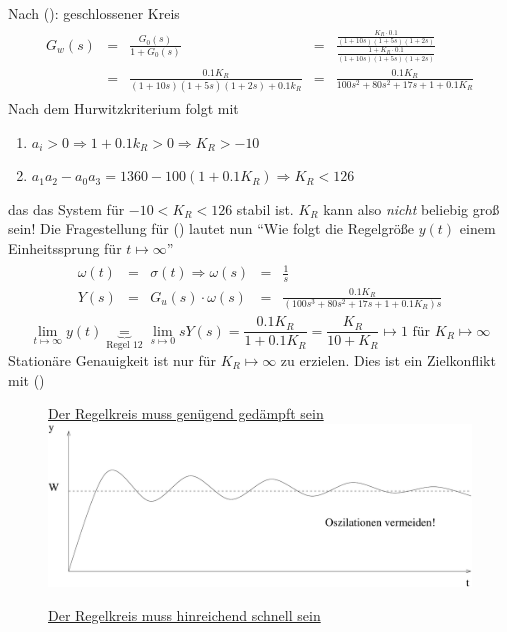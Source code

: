 \message{ !name(Mitschrieb_SysRegel.tex)}\documentclass[12pt,a4paper,ngerman]{scrartcl}
\newcommand{\RM}[1]{\MakeUppercase{\romannumeral #1{.}}}
\begin{document}
\begin{itemize}
Nach (\RM{1}): geschlossener Kreis
\begin{align*}
  \begin{array}{llllll}
    G_w(s)&=&\frac{G_0(s)}{1+G_0(s)}&=&\frac{\frac{K_R\cdot 0.1}{(1+10s)(1+5s)(1+2s)}}{\frac{1+K_R\cdot 0.1}{(1+10s)(1+5s)(1+2s)}}\\
    &=&\frac{0.1K_R}{(1+10s)(1+5s)(1+2s)+0.1k_R}&=&\frac{0.1K_R}{100s^2+80s^2+17s+1+0.1K_R}
  \end{array}
\end{align*}
Nach dem Hurwitzkriterium folgt mit
\begin{enumerate}
\item $a_i>0 \Rightarrow 1+0.1k_R>0\Rightarrow K_R> -10$
\item $a_1a_2-a_0a_3=1360-100(1+0.1K_R)\Rightarrow K_R<126$
\end{enumerate}
das das System für $-10<K_R<126$ stabil ist. $K_R$ kann also \emph{nicht} beliebig groß sein! Die Fragestellung für (\RM{2}) lautet nun ``Wie folgt die Regelgröße $y(t)$ einem Einheitssprung für $t\mapsto \infty$''
\begin{align*}
  \begin{array}{lllll}
    \omega (t)&=&\sigma(t)\Rightarrow \omega (s)&=&\frac{1}{s}\\
    Y(s)&=&G_u(s)\cdot\omega (s)&=&\frac{0.1K_R}{(100s^3+80s^2+17s+1+0.1K_R)s}
  \end{array}
\end{align*}
\[
\lim\limits_{t\mapsto\infty}{y(t)}\underbrace{=}_{\text{Regel 12}}\lim\limits_{s\mapsto 0}{sY(s)}=\frac{0.1K_R}{1+0.1K_R}=\frac{K_R}{10+K_R}\mapsto 1\text{ für }K_R\mapsto\infty
\]
Stationäre Genauigkeit ist nur für $K_R\mapsto\infty$ zu erzielen. Dies ist ein Zielkonflikt mit (\RM{1})
  \begin{figure}[H]
\item[\RM{3}] \underline{Der Regelkreis muss genügend gedämpft sein}\\

    \centering
    \includegraphics[width=.7\linewidth]{sysregel_No_3}
  \end{figure}
\begin{figure}[H]
\item[\RM{4}] \underline{Der Regelkreis muss hinreichend schnell sein}\\
  

\end{figure}
\end{itemize}
\end{document}
